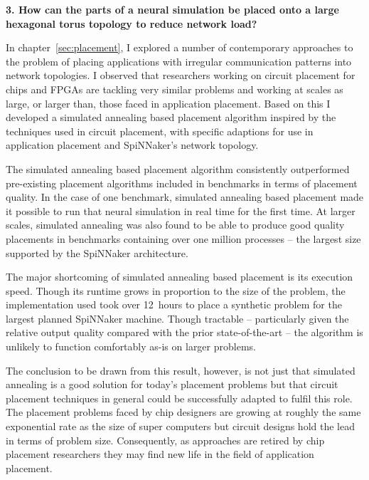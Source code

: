		\vspace*{1.0em}
		\noindent%
		\textbf{3. How can the parts of a neural simulation be placed onto a large
		hexagonal torus topology to reduce network load?}
		
		In chapter~\ref{sec:placement}, I explored a number of contemporary
		approaches to the problem of placing applications with irregular
		communication patterns into network topologies. I observed that researchers
		working on circuit placement for chips and FPGAs are tackling very similar
		problems and working at scales as large, or larger than, those faced in
		application placement. Based on this I developed a simulated annealing
		based placement algorithm inspired by the techniques used in circuit
		placement, with specific adaptions for use in application placement and
		SpiNNaker's network topology.
		
		The simulated annealing based placement algorithm consistently outperformed
		pre-existing placement algorithms included in benchmarks in terms of
		placement quality.  In the case of one benchmark, simulated annealing based
		placement made it possible to run that neural simulation in real time for
		the first time.  At larger scales, simulated annealing was also found to be
		able to produce good quality placements in benchmarks containing over one
		million processes -- the largest size supported by the SpiNNaker
		architecture.
		
		The major shortcoming of simulated annealing based placement is its
		execution speed. Though its runtime grows in proportion to the size of the
		problem, the implementation used took over 12~hours to place a synthetic
		problem for the largest planned SpiNNaker machine. Though tractable --
		particularly given the relative output quality compared with the prior
		state-of-the-art -- the algorithm is unlikely to function comfortably as-is
		on larger problems.
		
		The conclusion to be drawn from this result, however, is not just that
		simulated annealing is a good solution for today's placement problems but
		that circuit placement techniques in general could be successfully adapted
		to fulfil this role. The placement problems faced by chip designers are
		growing at roughly the same exponential rate as the size of super computers
		but circuit designs hold the lead in terms of problem size. Consequently,
		as approaches are retired by chip placement researchers they may find new
		life in the field of application placement.
		
